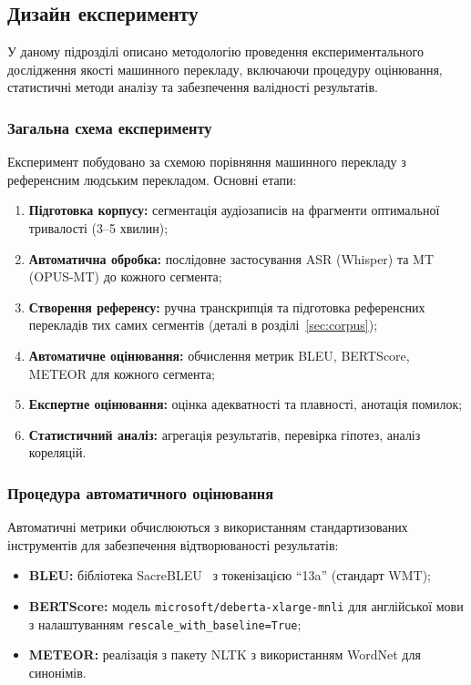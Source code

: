 \subsection{Дизайн експерименту}

У даному підрозділі описано методологію проведення експериментального
дослідження якості машинного перекладу, включаючи процедуру оцінювання,
статистичні методи аналізу та забезпечення валідності результатів.

\subsubsection{Загальна схема експерименту}

Експеримент побудовано за схемою порівняння машинного перекладу з
референсним людським перекладом.
Основні етапи:

\begin{enumerate}
    \item \textbf{Підготовка корпусу:} сегментація аудіозаписів на фрагменти
    оптимальної тривалості (3--5 хвилин);
    \item \textbf{Автоматична обробка:} послідовне застосування ASR (Whisper)
    та MT (OPUS-MT) до кожного сегмента;
    \item \textbf{Створення референсу:} ручна транскрипція та підготовка
    референсних перекладів тих самих сегментів (деталі в розділі~\ref{sec:corpus});
    \item \textbf{Автоматичне оцінювання:} обчислення метрик BLEU, BERTScore,
    METEOR для кожного сегмента;
    \item \textbf{Експертне оцінювання:} оцінка адекватності та плавності,
    анотація помилок;
    \item \textbf{Статистичний аналіз:} агрегація результатів, перевірка
    гіпотез, аналіз кореляцій.
\end{enumerate}

\subsubsection{Процедура автоматичного оцінювання}

Автоматичні метрики обчислюються з використанням стандартизованих
інструментів для забезпечення відтворюваності результатів:

\begin{itemize}
    \item \textbf{BLEU:} бібліотека SacreBLEU~\cite{post_bleu} з токенізацією
    ``13a'' (стандарт WMT);
    \item \textbf{BERTScore:} модель \texttt{microsoft/deberta-xlarge-mnli}
    для англійської мови з налаштуванням \texttt{rescale\_with\_baseline=True};
    \item \textbf{METEOR:} реалізація з пакету NLTK з використанням WordNet
    для синонімів.
\end{itemize}

